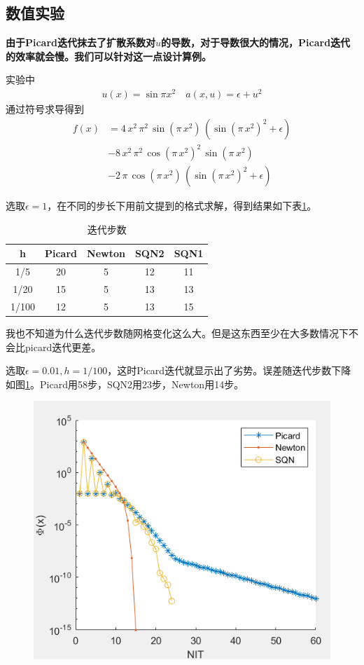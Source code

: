 \documentclass[12pt,a4paper]{article}
\begin{document}
\newpage
\subsection*{数值实验}

\textbf{由于Picard迭代抹去了扩散系数对$u$的导数，对于导数很大的情况，Picard迭代的效率就会慢。我们可以针对这一点设计算例。}

实验中
\begin{align*}
u(x) = \sin　\pi x^2 \quad a(x,u) = \epsilon + u^2
\end{align*}
通过符号求导得到
\begin{align*}
f(x) & = 4 \, x^2 \, \pi ^2 \, \sin \left( \pi \, x^2 \right) \, \left( {\sin \left( \pi \, x^2 \right)}^2 + \epsilon \right) \\
& - 8 \, x^2 \, \pi^2 \, {\cos \left( \pi \, x^2 \right)}^2 \, \sin \left( \pi \, x^2 \right) \\
& - 2 \, \pi \, \cos \left( \pi \, x^2 \right) \, \left( {\sin \left( \pi \, x^2 \right)}^2 + \epsilon \right)
\end{align*}

选取$\epsilon = 1$，在不同的步长下用前文提到的格式求解，得到结果如下表\cref{t1}。

\begin{table}[h]
\centering
\begin{tabular}{c|cccc}
\hline
h & Picard & Newton & SQN2 & SQN1 \\
\hline
1/5 & 20 & 5 & 12 & 11 \\
1/20 & 15 & 5 & 13 & 13 \\
1/100 & 12 & 5 & 13 & 15 \\
\hline
\end{tabular}
\caption{迭代步数}
\label{t1}
\end{table}
我也不知道为什么迭代步数随网格变化这么大。但是这东西至少在大多数情况下不会比picard迭代更差。

选取$\epsilon = 0.01, h = 1/100$，这时Picard迭代就显示出了劣势。误差随迭代步数下降如图\cref{f1}。Picard用58步，SQN2用23步，Newton用14步。

\begin{figure}[h]
\centering
\includegraphics[width=0.5\linewidth]{1}
\caption{}
\label{f1}
\end{figure}
\end{document}
